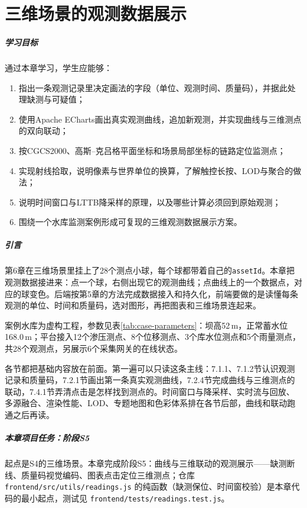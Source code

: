 \chapter{三维场景的观测数据展示}

\paragraph*{学习目标}

通过本章学习，学生应能够：

\begin{enumerate}
\item 指出一条观测记录里决定画法的字段（单位、观测时间、质量码），并据此处理缺测与可疑值；
\item 使用Apache ECharts画出真实观测曲线，追加新观测，并实现曲线与三维测点的双向联动；
\item 按CGCS2000、高斯--克吕格平面坐标和场景局部坐标的链路定位监测点；
\item 实现射线拾取，说明像素与世界单位的换算，了解触控长按、LOD与聚合的做法；
\item 说明时间窗口与LTTB降采样的原理，以及哪些计算必须回到原始观测；
\item 围绕一个水库监测案例形成可复现的三维观测数据展示方案。
\end{enumerate}

\paragraph*{引言}

第6章在三维场景里挂上了28个测点小球，每个球都带着自己的\texttt{assetId}。本章把观测数据接进来：点一个球，右侧出现它的观测曲线；点曲线上的一个数据点，对应的球变色。后端按第5章的方法完成数据接入和持久化，前端要做的是读懂每条观测的单位、时间和质量码，选对图形，再把图表和三维场景连起来。

案例水库为虚构工程，参数见表\ref{tab:case-parameters}：坝高52\,m，正常蓄水位168.0\,m；平台接入12个渗压测点、8个位移测点、3个库水位测点和5个雨量测点，共28个观测点，另展示6个采集网关的在线状态。

各节都把基础内容放在前面。第一遍可以只读这条主线：7.1.1、7.1.2节认识观测记录和质量码，7.2.1节画出第一条真实观测曲线，7.2.4节完成曲线与三维测点的联动，7.4.1节弄清点击是怎样找到测点的。时间窗口与降采样、实时流与回放、多源融合、渲染性能、LOD、专题地图和色彩体系排在各节后部，曲线和联动跑通之后再读。

\begin{tipbox}
\paragraph{本章项目任务：阶段S5}起点是S4的三维场景。本章完成阶段S5：曲线与三维联动的观测展示——缺测断线、质量码视觉编码、图表点击定位三维测点；仓库 \texttt{frontend/src/utils/readings.js} 的纯函数（缺测保位、时间窗校验）是本章代码的最小起点，测试见 \texttt{frontend/tests/readings.test.js}。
\end{tipbox}

